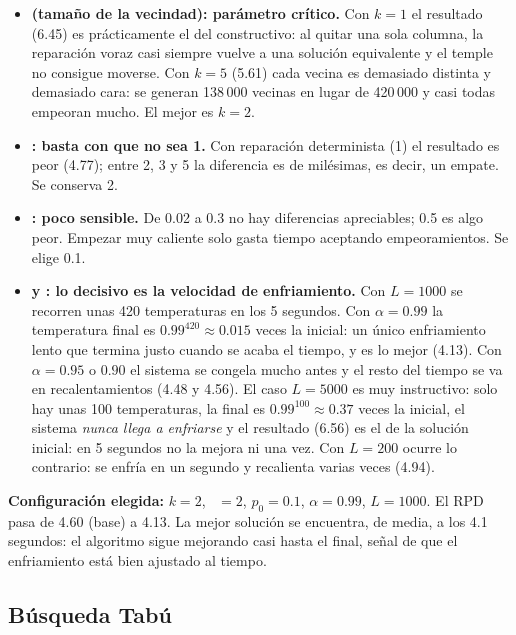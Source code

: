 \begin{itemize}
  \item \textbf{ (tamaño de la vecindad): parámetro crítico.} Con $k=1$ el resultado
        (6.45) es prácticamente el del constructivo: al quitar una sola columna, la
        reparación voraz casi siempre vuelve a una solución equivalente y el temple no
        consigue moverse. Con $k=5$ (5.61) cada vecina es demasiado distinta y demasiado
        cara: se generan 138\,000 vecinas en lugar de 420\,000 y casi todas empeoran mucho.
        El mejor es $k=2$.
  \item \textbf{: basta con que no sea 1.} Con reparación determinista (1) el
        resultado es peor (4.77); entre 2, 3 y 5 la diferencia es de milésimas, es decir,
        un empate. Se conserva 2.
  \item \textbf{: poco sensible.} De 0.02 a 0.3 no hay diferencias apreciables; 0.5
        es algo peor. Empezar muy caliente solo gasta tiempo aceptando empeoramientos. Se
        elige 0.1.
  \item \textbf{ y : lo decisivo es la velocidad de enfriamiento.} Con
        $L=1000$ se recorren unas 420 temperaturas en los 5 segundos. Con $\alpha=0.99$ la
        temperatura final es $0.99^{420}\approx 0.015$ veces la inicial: un único
        enfriamiento lento que termina justo cuando se acaba el tiempo, y es lo mejor
        (4.13). Con $\alpha=0.95$ o $0.90$ el sistema se congela mucho antes y el resto del
        tiempo se va en recalentamientos (4.48 y 4.56). El caso $L=5000$ es muy instructivo:
        solo hay unas 100 temperaturas, la final es $0.99^{100}\approx 0.37$ veces la
        inicial, el sistema \emph{nunca llega a enfriarse} y el resultado (6.56) es el de la
        solución inicial: en 5 segundos no la mejora ni una vez. Con $L=200$ ocurre lo
        contrario: se enfría en un segundo y recalienta varias veces (4.94).
\end{itemize}

\textbf{Configuración elegida:} $k=2$, ~$=2$, $p_0=0.1$, $\alpha=0.99$, $L=1000$. El
RPD pasa de 4.60 (base) a 4.13. La mejor solución se encuentra, de media, a los 4.1
segundos: el algoritmo sigue mejorando casi hasta el final, señal de que el enfriamiento
está bien ajustado al tiempo.

\subsection{Búsqueda Tabú}\label{sec:cal-tabu}

